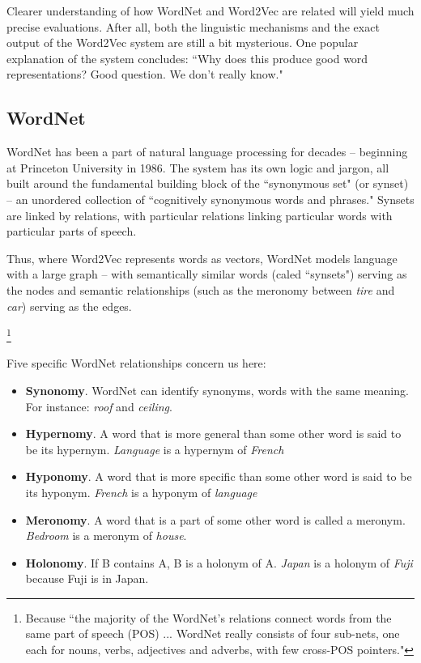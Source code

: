 \documentclass{article}
\begin{document}
Clearer understanding of how WordNet and Word2Vec are related will yield much precise evaluations. After all, both the linguistic mechanisms and the exact output of the Word2Vec system are still a bit mysterious. One popular explanation of the system concludes: ``Why does this produce good word representations? Good question. We don’t really know." \cite{goldberg2014word2vec}

\subsection{WordNet}  \label{WordNet}
WordNet has been a part of natural language processing for decades -- beginning at Princeton University in 1986. The system has its own logic and jargon, all built around the fundamental building block \cite{wordnet} of the ``synonymous set" (or synset) -- an unordered collection of ``cognitively synonymous words and phrases." \cite{cruse} Synsets are linked by relations, with particular relations linking particular words with particular parts of speech.

Thus, where Word2Vec represents words as vectors, WordNet models language with a large graph -- with semantically similar words (caled ``synsets") serving as the nodes and semantic relationships (such as the meronomy between \textit{tire} and \textit{car}) serving as the edges. 

\footnote{Because ``the majority of the WordNet’s relations connect words from the same part of speech (POS) ... WordNet really consists of four sub-nets, one each for nouns, verbs, adjectives and adverbs, with few cross-POS pointers."\cite{Wordnetwebsite}}

Five specific WordNet relationships concern us here:

\begin{itemize}

  \item \textbf{Synonomy}. WordNet can identify synonyms, words with the same meaning. For instance: \textit{roof} and \textit{ceiling}.
  \item \textbf{Hypernomy}. A word that is more general than some other word is said to be its hypernym. \textit{Language} is a hypernym of \textit{French}
  \item \textbf{Hyponomy}. A word that is more specific than some other word is said to be its hyponym. \textit{French} is a hyponym of \textit{language}
  \item \textbf{Meronomy}. A word that is a part of some other word is called a meronym. \textit{Bedroom} is a meronym of \textit{house}.
  \item \textbf{Holonomy}. If B contains A, B is a holonym of A. \textit{Japan} is a holonym of \textit{Fuji} because Fuji is in Japan.
\end{itemize}
\end{document}

